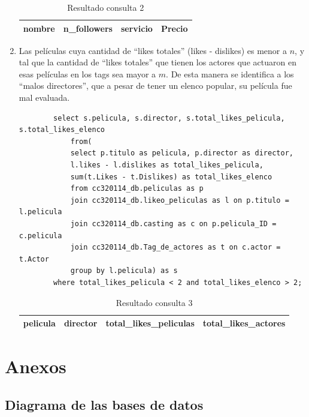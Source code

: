 \documentclass[12pt,letterpaper]{article}
\begin{document}
\begin{enumerate}
	\begin{table}[ht!]
			\centering
			\begin{tabular}{||c|l|l|l||} \hline 
				nombre & n\_followers & servicio & Precio\\ \hline
			\end{tabular}
			\caption {Resultado consulta 2}  
	\end{table}
	
	\item Las películas cuya cantidad de ``likes totales'' (likes - dislikes) es menor a $n$, y tal que la cantidad de ``likes totales'' que tienen los actores que actuaron en esas películas en los tags sea mayor a $m$. De esta manera se identifica a los ``malos directores'', que a pesar de tener un elenco popular, su película fue mal evaluada.
	
	\begin{verbatim}
		select s.pelicula, s.director, s.total_likes_pelicula, s.total_likes_elenco
			from(
			select p.titulo as pelicula, p.director as director,
			l.likes - l.dislikes as total_likes_pelicula,
			sum(t.Likes - t.Dislikes) as total_likes_elenco 
			from cc320114_db.peliculas as p
			join cc320114_db.likeo_peliculas as l on p.titulo = l.pelicula 
			join cc320114_db.casting as c on p.pelicula_ID = c.pelicula  
			join cc320114_db.Tag_de_actores as t on c.actor = t.Actor
			group by l.pelicula) as s
		where total_likes_pelicula < 2 and total_likes_elenco > 2;
	\end{verbatim}
	
	\begin{table}[ht!]
			\centering
			\begin{tabular}{||c|l|l|l||} \hline 
				pelicula & director & total\_likes\_peliculas & total\_likes\_actores\\ \hline
			\end{tabular}
			\caption {Resultado consulta 3}  
	\end{table}
	
\end{enumerate}


\section{Anexos}

\subsection{Diagrama de las bases de datos}


\centering

\end{document}
